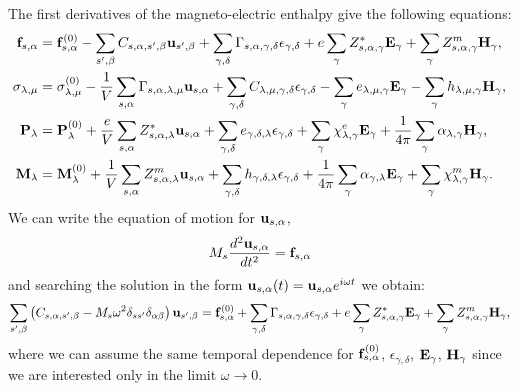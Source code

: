 \documentclass[12pt,a4paper]{article}
\begin{document}
{\color{orange}
The first derivatives of the magneto-electric enthalpy give the following equations:
\begin{align}
{\bf f}_{s,\alpha}&= {\bf f}^{(0)}_{s,\alpha}
-\sum_{s',\beta} C_{s,\alpha,s',\beta} {\bf u}_{s',\beta}
+\sum_{\gamma,\delta}
\Gamma_{s,\alpha,\gamma,\delta} 
\epsilon_{\gamma,\delta} +
e \sum_{\gamma} Z^*_{s,\alpha,\gamma} {\bf E}_{\gamma}
+\sum_{\gamma} 
Z^m_{s,\alpha,\gamma} {\bf H}_{\gamma}, \\
\sigma_{\lambda,\mu}&=  \sigma_{\lambda,\mu}^{(0)}
-{1\over V} \sum_{s,\alpha}
\Gamma_{s,\alpha,\lambda,\mu} {\bf u}_{s,\alpha}
+\sum_{\gamma,\delta} C_{\lambda,\mu,\gamma,\delta}  
\epsilon_{\gamma,\delta} -
\sum_{\gamma} e_{\lambda,\mu,\gamma} 
 {\bf E}_{\gamma}
-\sum_{\gamma}  h_{\lambda,\mu,\gamma} 
{\bf H}_{\gamma}, \\
{\bf P}_{\lambda}&= {\bf P}^{(0)}_{\lambda}
+{e\over V} \sum_{s,\alpha} Z^*_{s,\alpha,\lambda} 
{\bf u}_{s,\alpha} +
\sum_{\gamma,\delta} e_{\gamma,\delta,\lambda} 
\epsilon_{\gamma,\delta} +
\sum_{\gamma} 
\chi^e_{\lambda,\gamma}
{\bf E}_{\gamma} +
{1\over 4 \pi} \sum_{\gamma} \alpha_{\lambda,\gamma} 
{\bf H}_{\gamma}, \\
{\bf M}_{\lambda}&= {\bf M}^{(0)}_{\lambda}
+{1\over V}\sum_{s,\alpha} 
Z^m_{s,\alpha,\lambda} {\bf u}_{s,\alpha} +
\sum_{\gamma,\delta}  h_{\gamma,\delta,\lambda} 
\epsilon_{\gamma,\delta} 
+{1\over 4 \pi} \sum_{\gamma} \alpha_{\gamma,\lambda} {\bf E}_{\gamma}
+\sum_{\gamma} 
\chi^m_{\lambda,\gamma}
{\bf H}_{\gamma}.
\end{align}
We can write the equation of motion for ${\bf u}_{s,\alpha}$,
\begin{equation}
M_s {d^2 {\bf u}_{s,\alpha} \over d t^2} = {\bf f}_{s,\alpha}
\end{equation}
and searching the solution in the form ${\bf u}_{s,\alpha}(t)=
{\bf u}_{s,\alpha} e^{i\omega t}$ we obtain:
\begin{equation}
\sum_{s',\beta} \left(C_{s,\alpha,s',\beta} - 
M_s \omega^2 \delta_{ss'}\delta_{\alpha\beta}\right)
{\bf u}_{s',\beta}= {\bf f}^{(0)}_{s,\alpha} + \sum_{\gamma,\delta} 
\Gamma_{s,\alpha,\gamma,\delta} \epsilon_{\gamma,\delta}
+ e \sum_{\gamma} Z^*_{s,\alpha,\gamma} {\bf E}_{\gamma} 
+ \sum_{\gamma} Z^m_{s,\alpha,\gamma} 
{\bf H}_{\gamma},
\end{equation}
where we can assume the same temporal dependence for
${\bf f}^{(0)}_{s,\alpha}$, $\epsilon_{\gamma,\delta}$,
${\bf E}_{\gamma}$,
${\bf H}_{\gamma}$ since we are interested only in the limit
$\omega \rightarrow 0$.
}
\end{document}
